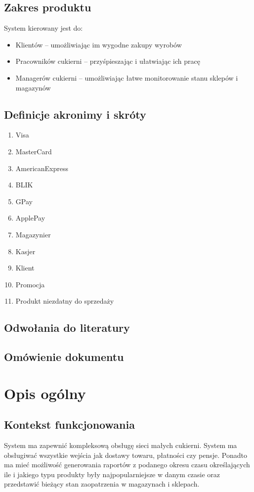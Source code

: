 \documentclass{article}
\begin{document}
\subsection{Zakres produktu}
System kierowany jest do:
\begin{itemize}
    \item Klientów -- umożliwiając im wygodne zakupy wyrobów
    \item Pracowników cukierni -- przyśpieszając i ułatwiając ich pracę
    \item Managerów cukierni --  umożliwiając łatwe monitorowanie stanu sklepów i magazynów 
\end{itemize}
\subsection{Definicje akronimy i skróty}
\begin{enumerate}
    \item Visa
    \item MasterCard
    \item AmericanExpress
    \item BLIK
    \item GPay
    \item ApplePay
    \item Magazynier
    \item Kasjer
    \item Klient
    \item Promocja
    \item Produkt niezdatny do sprzedaży
\end{enumerate}
\subsection{Odwołania do literatury}
\subsection{Omówienie dokumentu}
\section{Opis ogólny}
\subsection{Kontekst funkcjonowania}
System ma zapewnić kompleksową obsługę sieci małych cukierni.
System ma obsługiwać wszystkie wejścia jak dostawy towaru, płatności czy pensje. 
Ponadto ma mieć możliwość generowania raportów z podanego okresu czasu określających ile i jakiego typu produkty były najpopularniejsze w danym czasie oraz przedstawić bieżący stan zaopatrzenia w magazynach i sklepach. 
\end{document}
